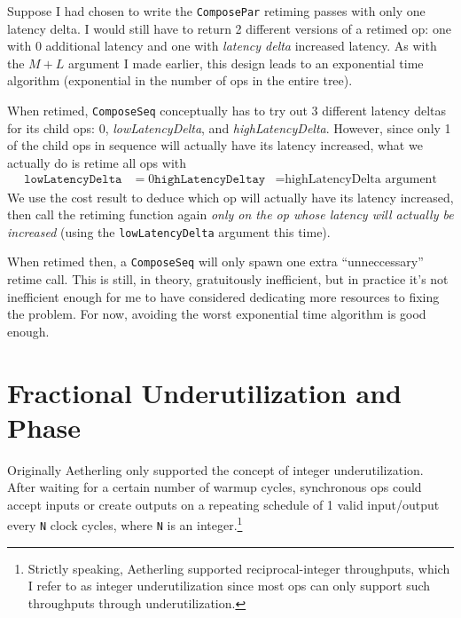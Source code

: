 \documentclass[12pt]{article}
\begin{document}
Suppose I had chosen to write the \texttt{ComposePar} retiming passes
with only one latency delta. I would still have to return 2 different
versions of a retimed op: one with 0 additional latency and one
with \textit{latency delta} increased latency. As with the $M+L$
argument I made earlier, this design leads to an exponential time
algorithm (exponential in the number of ops in the entire tree).

When retimed, \texttt{ComposeSeq} conceptually has to try out 3
different latency deltas for its child ops: 0,
\textit{lowLatencyDelta}, and \textit{highLatencyDelta}.  However,
since only 1 of the child ops in sequence will actually have its
latency increased, what we actually do is retime all ops with
\begin{align*}
    \texttt{lowLatencyDelta} &= 0
    \texttt{highLatencyDeltay} &= \text{highLatencyDelta argument}
\end{align*}
We use the cost result to deduce which op will actually have its
latency increased, then call the retiming function again
\textit{only on the op whose latency will actually be increased}
(using the \texttt{lowLatencyDelta} argument this time).

When retimed then, a \texttt{ComposeSeq} will only spawn one extra
``unneccessary'' retime call. This is still, in theory, gratuitously
inefficient, but in practice it's not inefficient enough for me to
have considered dedicating more resources to fixing the problem. For
now, avoiding the worst exponential time algorithm is good enough.

\section{Fractional Underutilization and Phase}


Originally Aetherling only supported the concept of integer
underutilization. After waiting for a certain number of warmup cycles,
synchronous ops could accept inputs or create outputs on a repeating
schedule of 1 valid input/output every \texttt{N} clock cycles, where
\texttt{N} is an integer.\footnote{Strictly speaking, Aetherling
  supported reciprocal-integer throughputs, which I refer to as
  integer underutilization since most ops can only support such
  throughputs through underutilization.}
\end{document}
